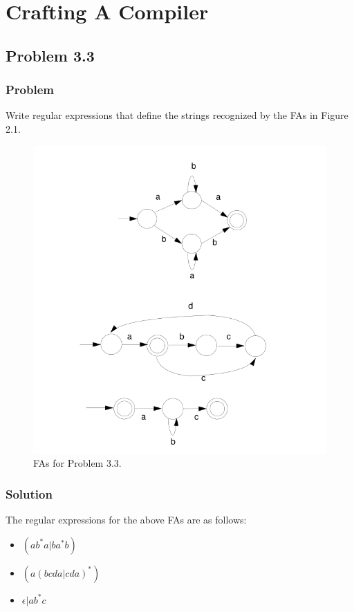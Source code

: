 \documentclass[letterpaper, 10pt,DIV=13]{scrartcl}
\numberwithin{equation}{section} %
\numberwithin{figure}{section} %
\numberwithin{table}{section} %
\begin{document}
\section{Crafting A Compiler}

\subsection{Problem 3.3}
\subsubsection{Problem}
Write regular expressions that define the strings recognized by the FAs
in Figure 2.1.

\begin{figure}[htp]
    \centering
    \includegraphics{lab2_FAs.png}
    \caption{FAs for Problem 3.3.}
    \label{fig:3.33}
\end{figure}
\label{Figure 3.33}

\subsubsection{Solution}
The regular expressions for the above FAs are as follows:
\begin{itemize}
    \item $(ab^*a|ba^*b)$
    \item $(a(bcda|cda)^*)$
    \item $\epsilon|ab^*c$
\end{itemize}
\end{document}
